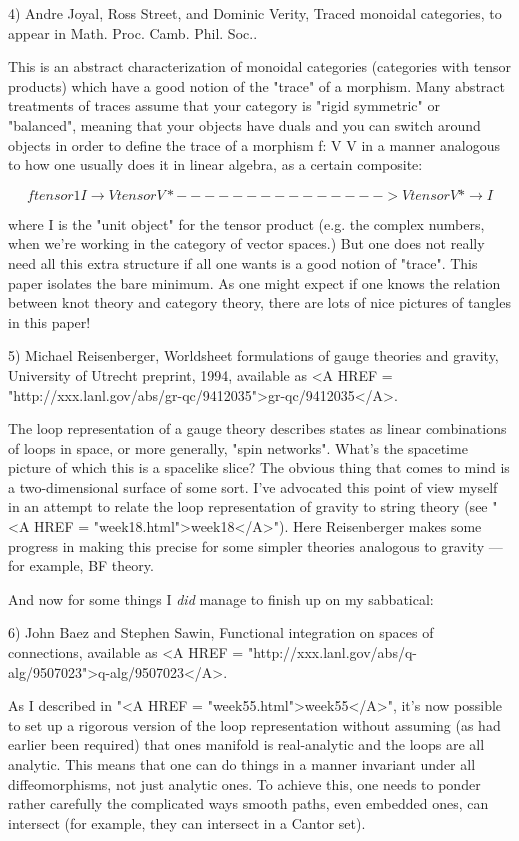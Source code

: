 4) Andre Joyal, Ross Street, and Dominic Verity, Traced monoidal categories,
to appear in Math. Proc. Camb. Phil. Soc..

This is an abstract characterization of monoidal categories (categories
with tensor products) which have a good notion of the "trace" of a morphism.
Many abstract treatments of traces assume that your category is "rigid 
symmetric" or "balanced", meaning that your objects have duals and you can 
switch around objects in order to define the trace of a 
morphism f: V \to  V in a manner analogous to how one usually does it in 
linear algebra, as a certain composite:


$$

                                  f tensor 1
               I \to  V tensor V* ---------------> V tensor V* \to  I
$$
    

where I is the "unit object" for the tensor product (e.g. the 
complex numbers, when we're working in the category of vector
spaces.)  But one does not really need all this extra structure 
if all one wants is a good notion of "trace".  This paper isolates
the bare minimum.  As one might expect if one knows the relation
between knot theory and category theory, there are lots of
nice pictures of tangles in this paper!


5)  Michael Reisenberger, Worldsheet formulations of gauge theories
and gravity, University of Utrecht preprint, 1994, available as 
<A HREF = "http://xxx.lanl.gov/abs/gr-qc/9412035">gr-qc/9412035</A>.

The loop representation of a gauge theory describes states as linear
combinations of loops in space, or more generally, "spin networks".  
What's the spacetime picture of which this is a spacelike slice?  The
obvious thing that comes to mind is a two-dimensional surface of some
sort.  I've advocated this point of view myself in an attempt to relate
the loop representation of gravity to string theory (see "<A HREF = "week18.html">week18</A>").  Here
Reisenberger makes some progress in making this precise for some
simpler theories analogous to gravity --- for example, BF theory.  

And now for some things I \emph{did} manage to finish up on my sabbatical:


6)  John Baez and Stephen Sawin, Functional integration on spaces
of connections, available as <A HREF = "http://xxx.lanl.gov/abs/q-alg/9507023">q-alg/9507023</A>.

As I described in "<A HREF = "week55.html">week55</A>", it's now possible to set up a rigorous
version of the loop representation without assuming (as had earlier
been required) that ones manifold is real-analytic and the loops are 
all analytic.  This means that one can do things in a manner invariant
under all diffeomorphisms, not just analytic ones.  To achieve this,
one needs to ponder rather carefully the complicated ways smooth
paths, even embedded ones, can intersect (for example, they can intersect
in a Cantor set).   



